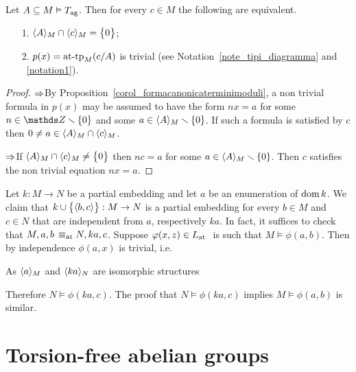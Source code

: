 \documentclass[creche.tex]{subfiles}
\begin{document}
\begin{proposition}
Let $A\subseteq M\models T_{\rm ag}$. Then for every $c\in M$ the following are equivalent.
\begin{itemize}
 \item[1.] $\<A\>_M\cap\<c\>_M=\big\{0\big\}$;
 \item[2.] $p(x)=\attp_M(c/A)$ is trivial (see Notation~\ref{note_tipi_diagramma} and ~\ref{notation1}).
\end{itemize}
\end{proposition}
\begin{proof}
$\IMP$\quad By Proposition~\ref{corol_formacanonicaterminimoduli}, a non trivial formula in $p(x)$ may be assumed to have the form $nx=a$ for some $n\in\ZZ\sm\{0\}$ and some $a\in\<A\>_M\sm\{0\}$. If such a formula is satisfied by $c$ then $0\neq a\in\<A\>_M\cap\<c\>_M$. 

$\IMP$\quad If $\<A\>_M\cap\<c\>_M\neq\big\{0\big\}$ then $nc=a$ for some $a\in\<A\>_M\sm\{0\}$. Then $c$ satisfies the non trivial equation $nx=a$.
\end{proof}


\begin{remark}\label{oss_liberi_qf}
Let $k:M\to N$ be a partial embedding and let $a$ be an enumeration of $\dom k$. We claim that  $k\cup\big\{\<b,c\>\big\}:M\to N$ is a partial embedding for every $b\in M$ and $c\in N$ that are independent from $a$, respectively $ka$. In fact, it suffices to check that $M,a,b\,\equiv_{\rm at}N,ka, c$. Suppose $\phi(x,z)\in\atL$ \ is such that $M\models\phi(a,b)$. Then by independence $\phi(a,x)$ is trivial, i.e.


As $\<a\>_M$ and  $\<ka\>_N$ are isomorphic structures 


Therefore $N\models\phi(ka,c)$. The proof that $N\models\phi(ka,c)$ implies $M\models\phi(a,b)$ is similar.\QED 
\end{remark}



\section{Torsion-free abelian groups}
\end{document}

